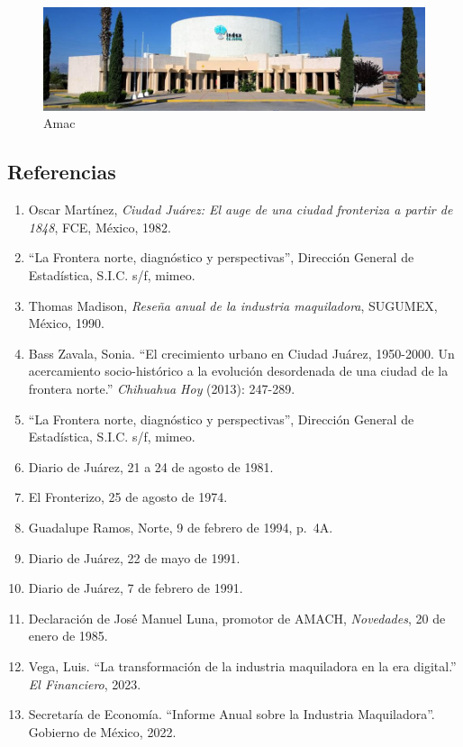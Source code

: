 \documentclass[
  10pt,
  letterpaper,
]{book}
\providecommand{\tightlist}{%
  \setlength{\itemsep}{0pt}\setlength{\parskip}{0pt}}\usepackage{longtable,booktabs,array}
\begin{document}
\begin{figure}[H]

{\centering \includegraphics{Img/Amac.jpg}

}

\caption{Amac}

\end{figure}%

\subsection{Referencias}\label{referencias}

\begin{enumerate}
\def\labelenumi{\arabic{enumi}.}
\tightlist
\item
  Oscar Martínez, \emph{Ciudad Juárez: El auge de una ciudad fronteriza
  a partir de 1848}, FCE, México, 1982.
\item
  ``La Frontera norte, diagnóstico y perspectivas'', Dirección General
  de Estadística, S.I.C. s/f, mimeo.
\item
  Thomas Madison, \emph{Reseña anual de la industria maquiladora},
  SUGUMEX, México, 1990.
\item
  Bass Zavala, Sonia. ``El crecimiento urbano en Ciudad Juárez,
  1950-2000. Un acercamiento socio-histórico a la evolución desordenada
  de una ciudad de la frontera norte.'' \emph{Chihuahua Hoy} (2013):
  247-289.
\item
  ``La Frontera norte, diagnóstico y perspectivas'', Dirección General
  de Estadística, S.I.C. s/f, mimeo.
\item
  Diario de Juárez, 21 a 24 de agosto de 1981.
\item
  El Fronterizo, 25 de agosto de 1974.
\item
  Guadalupe Ramos, Norte, 9 de febrero de 1994, p.~4A.
\item
  Diario de Juárez, 22 de mayo de 1991.
\item
  Diario de Juárez, 7 de febrero de 1991.
\item
  Declaración de José Manuel Luna, promotor de AMACH, \emph{Novedades},
  20 de enero de 1985.
\item
  Vega, Luis. ``La transformación de la industria maquiladora en la era
  digital.'' \emph{El Financiero}, 2023.
\item
  Secretaría de Economía. ``Informe Anual sobre la Industria
  Maquiladora''. Gobierno de México, 2022.
\end{enumerate}
\end{document}
